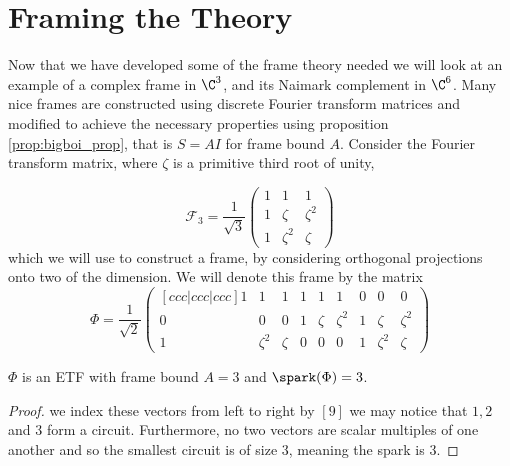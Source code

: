 \section{Framing the Theory}
\label{sec:example}
Now that we have developed some of the frame theory needed we will look at an example of a complex frame in $\C^3$, and its Naimark complement in $\C^6$. Many nice frames are constructed using discrete Fourier transform matrices and modified to achieve the necessary properties using proposition \ref{prop:bigboi_prop}, that is $S=AI$ for frame bound $A$. %
Consider the Fourier transform matrix, where $\zeta$ is a primitive third root of unity,

$$\mathcal{F}_{3}=\frac{1}{\sqrt{3}}\begin{pmatrix}1& 1& 1 \\ 1 & \zeta & \zeta^2\\ 1 & \zeta^2 & \zeta \end{pmatrix}$$
which we will use to construct a frame, by considering orthogonal projections onto two of the dimension. We will denote this frame by the matrix
$$\Phi=\frac{1}{\sqrt{2}}\begin{pmatrix}[ccc|ccc|ccc]
1& 1& 1 & 1& 1& 1 & 0 & 0 & 0 \\ 0&0&0&1 & \zeta & \zeta^2 & 1 & \zeta & \zeta^2\\ 1 & \zeta^2 & \zeta &0&0&0& 1 & \zeta^2 & \zeta\end{pmatrix}$$

\begin{example}
$\Phi$ is an ETF with frame bound $A=3$ and $\spark(\Phi)=3$.
\end{example}

\begin{proof}
\iftoggle{full}{First to show that $\Phi$ is tight frame we will compute the frame operator. Notice that the inner product of any two rows is equivalent, up to a constant multiple to the inner product of the rows of $\mathcal{F}_3$ and so $S=3I_3$, meaning $\Phi$ is a tight frame by proposition \ref{prop:bigboi_prop}.

This is an example of a maximal tight frame as there are no tight frames for $\C^3$ with more than $9$ vectors.

Now we need to show that this is an equal angular tight frame. We can do this with a tool such as Matlab or Sage where we find that $\ip{\phi_j,\phi_k}=\frac{1}{2}$ for all $j\neq k$ and $\ip{\phi_j,\phi_j}=1$ for all $j$. And so $\Phi$ is a finite unit norm equiangular tight frame.

Finally, notice if}{If} we index these vectors from left to right by $[9]$ we may notice that $1,2$ and $3$ form a circuit. Furthermore, no two vectors are scalar multiples of one another and so the smallest circuit is of size $3$, meaning the spark is $3$.
\end{proof}

